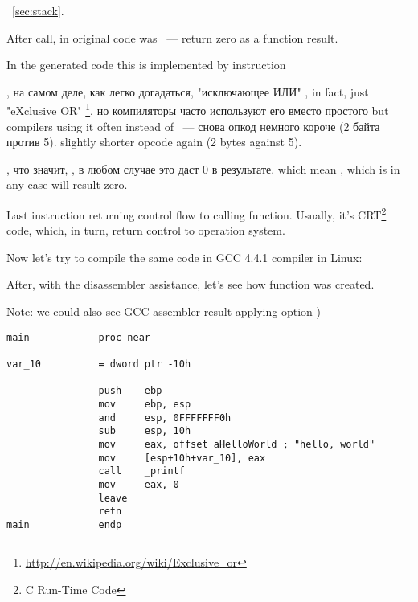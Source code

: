 ~\ref{sec:stack}.

{After \printf call, in original \CCpp code was  ~--- return zero as a \main function result.} 

{In the generated code this is implemented by instruction}  

\IFRU
{\XOR, на самом деле, как легко догадаться, "исключающее ИЛИ"}
{\XOR, in fact, just "eXclusive OR"}
\footnote{\url{http://en.wikipedia.org/wiki/Exclusive_or}}, 
\IFRU
{но компиляторы часто используют его вместо простого}
{but compilers using it often instead of}
 ~--- 
\IFRU
{снова опкод немного короче (2 байта против 5).}
{slightly shorter opcode again (2 bytes against 5).}

, 
\IFRU
{что значит, , в любом случае это даст 0 в результате.}
{which mean , which is in any case will result zero.}

{Last instruction \RET returning control flow to calling function.
Usually, it's \CCpp CRT\footnote{C Run-Time Code} code, which, in turn, 
return control to operation system.}

{Now let's try to compile the same \CCpp code in GCC 4.4.1 compiler in Linux}: 

{After, with the \IDA disassembler assistance, let's see how \main function was created.} 

{Note: we could also see GCC assembler result applying option} )

\begin{lstlisting}
main            proc near

var_10          = dword ptr -10h

                push    ebp
                mov     ebp, esp
                and     esp, 0FFFFFFF0h
                sub     esp, 10h
                mov     eax, offset aHelloWorld ; "hello, world"
                mov     [esp+10h+var_10], eax
                call    _printf
                mov     eax, 0
                leave
                retn
main            endp
\end{lstlisting}


